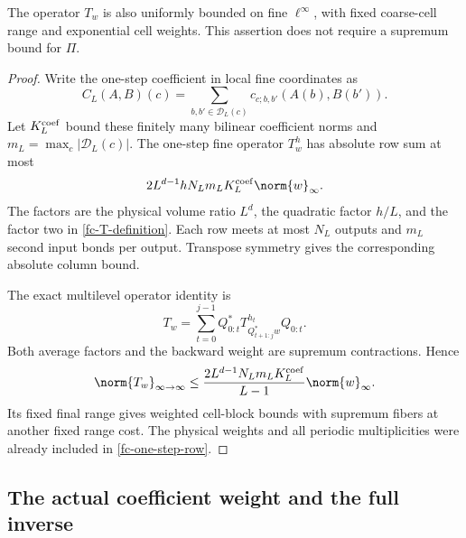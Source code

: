 \begin{lemma}
\label{fc-T-supremum}
The operator $T_w$ is also uniformly bounded on fine
$\ell^\infty$, with fixed coarse-cell range and exponential cell
weights. This assertion does not require a supremum bound for
$\Pi$.
\end{lemma}

\begin{proof}
Write the one-step coefficient in local fine coordinates as
\[
 C_L(A,B)(c)=\sum_{b,b'\in\mathcal D_L(c)}
                    c_{c;b,b'}(A(b),B(b')).
\]
Let $K_L^{\rm coef}$ bound these finitely many bilinear coefficient
norms and $m_L=\max_c|\mathcal D_L(c)|$. The one-step fine
operator $T_w^h$ has absolute row sum at most
\begin{equation}
 2L^{d-1}hN_Lm_LK_L^{\rm coef}\norm{w}_\infty.
 \label{fc-one-step-row}
\end{equation}
The factors are the physical volume ratio $L^d$, the quadratic
factor $h/L$, and the factor two in
\eqref{fc-T-definition}. Each row meets at most $N_L$ outputs and
$m_L$ second input bonds per output. Transpose symmetry gives the
corresponding absolute column bound.

The exact multilevel operator identity is
\begin{equation}
 T_w=\sum_{t=0}^{j-1}Q_{0:t}^*
           T^{h_t}_{Q_{t+1:j}^*w}Q_{0:t}.
 \label{fc-T-operator-chain}
\end{equation}
Both average factors and the backward weight are supremum
contractions. Hence
\begin{equation}
 \norm{T_w}_{\infty\to\infty}
 \le \frac{2L^{d-1}N_Lm_LK_L^{\rm coef}}{L-1}
                         \norm{w}_\infty.
 \label{fc-T-supremum-bound}
\end{equation}
Its fixed final range gives weighted cell-block bounds with
supremum fibers at another fixed range cost. The physical weights
and all periodic multiplicities were already included in
\eqref{fc-one-step-row}.
\end{proof}

\subsection{The actual coefficient weight and the full inverse}
\label{fc-full-neighborhood-section}

